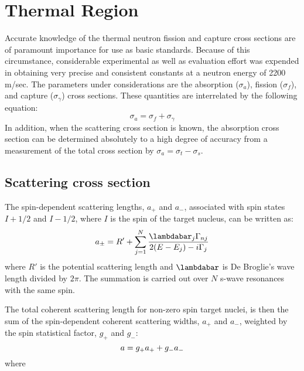 \documentclass[twocolumn,amsmath,amssymb,10pt,groupedaddress,a4paper]{revtex4}
\begin{document}
\section{Thermal Region}

Accurate knowledge of the thermal neutron fission and capture cross sections are of paramount
importance for use as basic standards. Because of this circumstance, considerable experimental
as well as evaluation effort was expended in obtaining very precise and consistent constants at a
neutron energy of 2200 m/sec. The parameters under considerations are the absorption ($\sigma_a$),
fission ($\sigma_f$), and capture ($\sigma_\gamma$) cross sections. These quantities are interrelated
by the following equation:
\begin{equation}
\sigma_a = \sigma_f + \sigma_\gamma
\end{equation}
In addition, when the scattering cross section is known, the absorption cross section can be determined
absolutely  to a high degree of accuracy from a measurement of the total cross section by $\sigma_a=
\sigma_t - \sigma_s$.



\subsection{Scattering cross section}

The spin-dependent scattering lengths, $a_+$ and $a_-$, associated with spin states $I+1/2$ and $I-1/2$, where $I$ is the spin
of the target  nucleus, can be written as:
\begin{equation}
a_\pm = R' + \sum_{j=1}^N \frac{\lambdabar_j \Gamma_{nj}}{2(E - E_j) - i\Gamma_j}
\label{apm}
\end{equation}
\noindent where $R'$ is the potential scattering length and $\lambdabar$ is De Broglie's wave length divided by $2\pi$. The summation
is carried out over $N$ s-wave resonances with the same spin.

The total coherent scattering length  for non-zero spin target nuclei, is then the sum of the spin-dependent coherent
scattering widths, $a_+$ and $a_-$, weighted by the spin statistical factor, $g_+$ and $g_-$:
\begin{equation}
a = g_+a_+ + g_-a_-  \notag
\end{equation}
\noindent where
\end{document}
